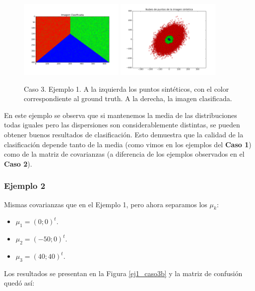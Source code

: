 \documentclass[a4paper,11pt]{article}
\begin{document}
\begin{figure}[h!]
\centering
\includegraphics[width=0.45\textwidth]{img/ej2-caso3a-puntos.png}
\includegraphics[width=0.45\textwidth]{img/ej2-caso3a-clfPhantom.png}
\caption{Caso 3. Ejemplo 1. A la izquierda los puntos sintéticos, con el color correspondiente al ground truth. A la derecha, la imagen clasificada.}
\label{ej2_caso3a}
\end{figure}

En este ejemplo se observa que si mantenemos la media de las distribuciones todas iguales pero las dispersiones son considerablemente distintas, se pueden obtener buenos resultados de clasificación. Esto demuestra que la calidad de la clasificación depende tanto de la media (como vimos en los ejemplos del {\bf Caso 1}) como de la matriz de covarianzas (a diferencia de los ejemplos observados en el {\bf Caso 2}).


\subsubsection{Ejemplo 2}
Mismas covarianzas que en el Ejemplo 1, pero ahora separamos los $\mu_k$:
\begin{itemize}
  \item $\mu_1 = (0;0)^t$.
  \item $\mu_2 = (-50;0)^t$.
  \item $\mu_3 = (40;40)^t$.
\end{itemize}

Los resultados se presentan en la Figura \ref{ej1_caso3b} y la matriz de confusión quedó así:
\end{document}
